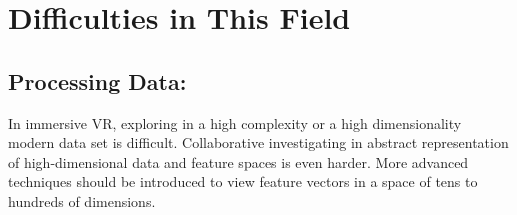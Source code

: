 \documentclass[10pt,twocolumn,letterpaper]{article}
\begin{document}






\section{Difficulties in This Field}

\subsection{Processing Data:}In immersive VR, exploring in a high complexity or a high dimensionality modern data set is difficult. Collaborative investigating in abstract representation of high-dimensional data and feature spaces is even harder\cite{Donalek2014}. More advanced techniques should be introduced to view feature vectors in a space of tens to hundreds of dimensions.
\end{document}

